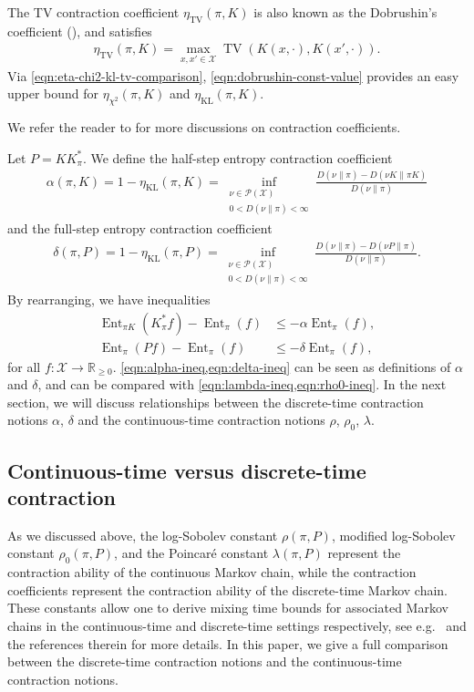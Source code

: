 \documentclass[11pt]{article}
\def\bR{\mathbb{R}}
\def\cP{\mathcal{P}}
\def\cX{\mathcal{X}}
\DeclareMathOperator\Ent{\mathrm{Ent}}
\DeclareMathOperator\KL{\mathrm{KL}}
\DeclareMathOperator\TV{\mathrm{TV}}
\theoremstyle{definition}
\begin{document}
The TV contraction coefficient $\eta_{\TV}(\pi, K)$ is also known as the Dobrushin's coefficient (\cite{dobrushin1956central}), and satisfies
\begin{align} \label{eqn:dobrushin-const-value}
  \eta_{\TV}(\pi, K) = \max_{x,x'\in \cX} \TV(K(x,\cdot),K(x',\cdot)).
\end{align}
Via \cref{eqn:eta-chi2-kl-tv-comparison}, \cref{eqn:dobrushin-const-value} provides an easy upper bound for $\eta_{\chi^2}(\pi, K)$ and $\eta_{\KL}(\pi, K)$.

We refer the reader to \cite{raginsky2016strong,polyanskiy2024information} for more discussions on contraction coefficients.


Let $P = KK_\pi^*$. We define the half-step entropy contraction coefficient
\begin{align}
  \alpha(\pi, K) = 1-\eta_{\KL}(\pi, K) = \inf_{\substack{\nu\in \cP(\cX) \\ 0<D(\nu\|\pi)<\infty}} \frac{D(\nu\|\pi)-D(\nu K\|\pi K)}{D(\nu\|\pi)}
\end{align}
and the full-step entropy contraction coefficient
\begin{align}
  \delta(\pi, P) = 1-\eta_{\KL}(\pi, P) = \inf_{\substack{\nu\in \cP(\cX) \\ 0<D(\nu\|\pi)<\infty}} \frac{D(\nu\|\pi)-D(\nu P\|\pi)}{D(\nu\|\pi)}.
\end{align}
By rearranging, we have inequalities
\begin{align}
  \label{eqn:alpha-ineq} \Ent_{\pi K}(K_\pi^*f) - \Ent_\pi(f) &\le -\alpha \Ent_\pi(f), \\
  \label{eqn:delta-ineq} \Ent_\pi(Pf) - \Ent_\pi(f) &\le -\delta \Ent_\pi(f),
\end{align}
for all $f: \cX \to \bR_{\ge 0}$.
\cref{eqn:alpha-ineq,eqn:delta-ineq} can be seen as definitions of $\alpha$ and $\delta$, and can be compared with \cref{eqn:lambda-ineq,eqn:rho0-ineq}.
In the next section, we will discuss relationships between the discrete-time contraction notions $\alpha$, $\delta$ and the continuous-time contraction notions $\rho$, $\rho_0$, $\lambda$.

\subsection{Continuous-time versus discrete-time contraction} \label{sec:intro:continuous-cs-discrete}
As we discussed above, the log-Sobolev constant $\rho(\pi, P)$, modified log-Sobolev constant $\rho_0(\pi, P)$, and the Poincar\'e constant $\lambda(\pi, P)$ represent the contraction ability of the continuous Markov chain, while the contraction coefficients represent the contraction ability of the discrete-time Markov chain.
These constants allow one to derive mixing time bounds for associated Markov chains in the continuous-time and discrete-time settings respectively, see e.g.~\cite{caputo2023lecture} and the references therein for more details.
In this paper, we give a full comparison between the discrete-time contraction notions and the continuous-time contraction notions.
\end{document}
